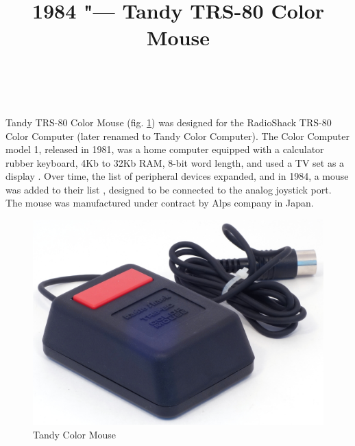 \documentclass[11pt, a4paper]{article}
\begin{document}
\title{1984 "--- Tandy TRS-80 Color Mouse}
\date{}
\author{~}
\maketitle
{}

Tandy TRS-80 Color Mouse (fig. \ref{fig:TandyColorMousePic}) was designed for the RadioShack TRS-80 Color Computer (later renamed to Tandy Color Computer). The Color Computer model 1, released in 1981, was a home computer equipped with a calculator rubber keyboard, 4Kb to 32Kb RAM, 8-bit word length, and used a TV set as a display \cite{wiki}. Over time, the list of peripheral devices expanded, and in 1984, a mouse  was added to their list \cite{adv}, designed to be connected to the analog joystick port. The mouse was manufactured under contract by Alps company in Japan.

\begin{figure}[h]
   \centering
    \includegraphics[scale=0.66]{1984_tandy_trs80_color_mouse/pic_30.jpg}
    \caption{Tandy Color Mouse}
    \label{fig:TandyColorMousePic}
\end{figure}
\end{document}
